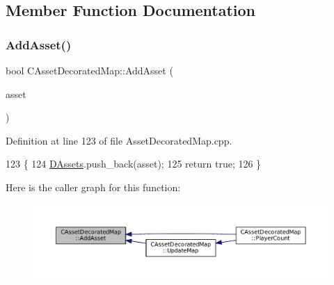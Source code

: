 \subsection{Member Function Documentation}
\hypertarget{classCAssetDecoratedMap_aaa798030159fd44251dd60aef9b00516}{}\label{classCAssetDecoratedMap_aaa798030159fd44251dd60aef9b00516} 
\subsubsection{\texorpdfstring{Add\+Asset()}{AddAsset()}}
{\footnotesize\ttfamily bool C\+Asset\+Decorated\+Map\+::\+Add\+Asset (\begin{DoxyParamCaption}\item[{std\+::shared\+\_\+ptr$<$ \hyperlink{classCPlayerAsset}{C\+Player\+Asset} $>$}]{asset }\end{DoxyParamCaption})}



Definition at line 123 of file Asset\+Decorated\+Map.\+cpp.


\begin{DoxyCode}
123                                                                     \{
124     \hyperlink{classCAssetDecoratedMap_a94eeed5b16141169b1ba6cb3842055aa}{DAssets}.push\_back(asset);
125     \textcolor{keywordflow}{return} \textcolor{keyword}{true};
126 \}
\end{DoxyCode}
Here is the caller graph for this function\+:\nopagebreak
\begin{figure}[H]
\begin{center}
\leavevmode
\includegraphics[width=350pt]{classCAssetDecoratedMap_aaa798030159fd44251dd60aef9b00516_icgraph}
\end{center}
\end{figure}
\hypertarget{classCAssetDecoratedMap_aa71f42e162c1d3003248306bfa15e69d}{}\label{classCAssetDecoratedMap_aa71f42e162c1d3003248306bfa15e69d} 
